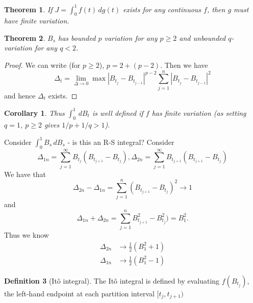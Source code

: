 \documentclass[10pt, oneside, reqno]{amsart}
\theoremstyle{plain}%
\newtheorem{thm}{Theorem}[section]
\newtheorem*{cor}{Corollary}
\theoremstyle{definition}
\newtheorem{defn}[thm]{Definition}
\theoremstyle{remark}
\begin{document}
\begin{thm}
	If $J = \int_0^1 f(t) \, dg(t)$ exists for any continuous $f$, then $g$ must have finite variation.  
\end{thm}

\begin{thm}
	$B_s$ has bounded $p$ variation for any $p \geq 2$ and unbounded $q$-variation for any $q < 2$.
\end{thm}

\begin{proof}
	We can write (for $p \geq 2$), $p = 2 + (p-2)$.  Then we have \[
		\Delta_t = \lim_{\Delta \rightarrow 0} \max |{B_{t_j}} - B_{t_{j-1}} |^{p-2} \sum_{j=1}^n |B_{t_j} - B_{t_{j-1}} |^{2}
	\] and hence $\Delta_t$ exists.
\end{proof}

\begin{cor}
	Thus $\int_0^1 \, dB_t$ is well defined if $f$ has finite variation (as setting $q = 1$, $ p \geq 2$ gives $1/p + 1/q > 1$).
\end{cor}

Consider $\int_0^1 B_s \, dB_s$ - is this an R-S integral?  Consider \[
	\Delta_{1n} = \sum_{j=1}^\infty B_{t_j} ( B_{t_{j+1}} - B_{t_j}), \Delta_{2n} = \sum_{j=1}^\infty B_{t_{j+1}} ( B_{t_{j+1}} - B_{t_j})
\]  We have that \[
	\Delta_{2n} - \Delta_{1n} = \sum_{j=1}^n ( B_{t_{j+1}} - B_{t_j})^2 \rightarrow 1
\] and \[
	\Delta_{1n} + \Delta_{2n} = \sum_{j=1}^n {B_{t_{j+1}}^2} - B_{t_j}^2 ) = B_1^2. 
\]  Thus we know \begin{align*}
	\Delta_{2n} &\rightarrow \frac{1}{2}(B_1^2 + 1) \\
	\Delta_{1n} &\rightarrow \frac{1}{2}(B_1^2 - 1) 
\end{align*}

\begin{defn}[It\^o integral]
	The It\^o integral is defined by evaluating $f(B_{t_j})$, the left-hand endpoint at each partition interval $[t_{j}, t_{j+1})$
\end{defn}
\end{document}
